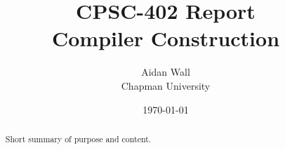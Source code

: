 \documentclass{article}
\title{CPSC-402 Report\\Compiler Construction}
\author{Aidan Wall \\ Chapman University}
\date{\today}
\theoremstyle{theorem}
\theoremstyle{definition}
\theoremstyle{remark}
\begin{document}
\maketitle

\begin{abstract}
Short  summary of purpose and content.
\end{abstract}

\tableofcontents













\end{document}
